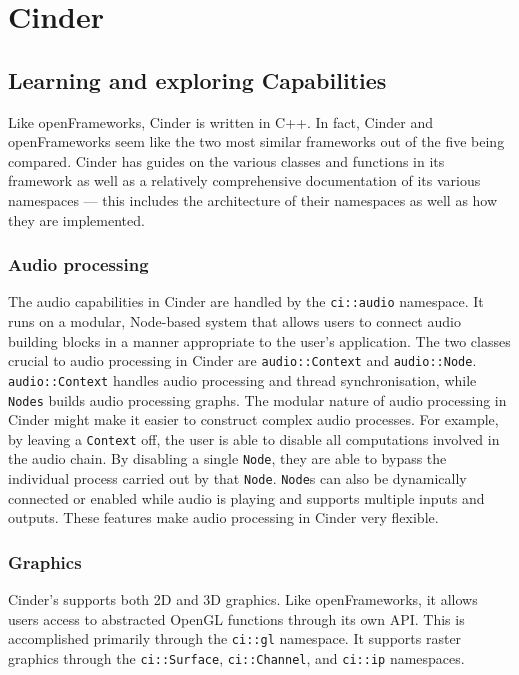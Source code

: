 \documentclass[../main_frameworkreview.tex]{subfiles}
\begin{document}
\section{Cinder}

\subsection{Learning and exploring Capabilities}
Like openFrameworks, Cinder is written in C++. In fact, Cinder and openFrameworks seem like the two most similar frameworks out of the five being compared. Cinder has guides on the various classes and functions in its framework as well as a relatively comprehensive documentation of its various namespaces --- this includes the architecture of their namespaces as well as how they are implemented.
\subsubsection{Audio processing}
The audio capabilities in Cinder are handled by the \verb|ci::audio| namespace. It runs on a modular, Node-based system that allows users to connect audio building blocks in a manner appropriate to the user's application.\cite{CinderAudioAPI} The two classes crucial to audio processing in Cinder are \verb|audio::Context| and \verb|audio::Node|.\cite{CinderAudioAPI} \verb|audio::Context| handles audio processing and thread synchronisation, while \verb|Nodes| builds audio processing graphs. The modular nature of audio processing in Cinder might make it easier to construct complex audio processes. For example, by leaving a \verb|Context| off, the user is able to disable all computations involved in the audio chain. By disabling a single \verb|Node|, they are able to bypass the individual process carried out by that \verb|Node|. \verb|Node|s can also be dynamically connected or enabled while audio is playing and supports multiple inputs and outputs.\cite{CinderAudioAPI} These features make audio processing in Cinder very flexible.
\subsubsection{Graphics}
Cinder's supports both 2D and 3D graphics. Like openFrameworks, it allows users access to abstracted OpenGL functions through its own API. This is accomplished primarily through the \verb|ci::gl| namespace. It supports raster graphics through the \verb|ci::Surface|, \verb|ci::Channel|, and \verb|ci::ip| namespaces.
\end{document}

